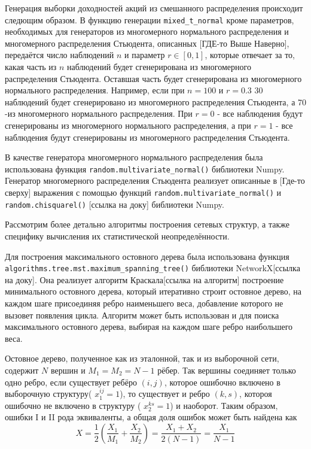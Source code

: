 Генерация выборки доходностей акций из смешанного распределения происходит следющим образом. В функцию генерации \verb|mixed_t_normal| кроме параметров, необходимых для генераторов из многомерного нормального распределения и многомерного распределения Стьюдента, описанных [ГДЕ-то Выше Наверно], передаётся число наблюдений $n$ и параметр $r \in [0,1]$, которые отвечает за то, какая часть из $n$ наблюдений будет сгенерирована из многомерного распределения Стьюдента. Оставшая часть будет сгенерирована из многомерного нормального распределения. Например, если при $n=100$ и $r=0.3$ 30 наблюдений будет сгенерировано из многомерного распределения Стьюдента, а 70 -из многомерного нормального распределения. При $r=0$ - все наблюдения будут сгенерированы из многомерного нормального распределения, а при  $r=1$ - все наблюдения будут сгенерированы из многомерного распределения Стьюдента. 

В качестве генератора многомерного нормального распределения  была использована функция \verb|random.multivariate_normal()| библиотеки Numpy. Генератор 
многомерного распределения Стьюдента реализует описанные в [Где-то сверху] выражения с помощью функций \verb|random.multivariate_normal()| и  \verb|random.chisquarel()| [ссылка на доку] библиотеки Numpy.

Рассмотрим более детально алгоритмы построения сетевых структур, а также специфику вычисления их статистической неопределённости.


Для построения максимального остовного дерева была использована  функция \verb|algorithms.tree.mst.maximum_spanning_tree()| библиотеки NetworkX[ссылка на доку]. Она реализует алгоритм Краскала[ссылка на алгоритм] построение минимального остовного дерева, который итеративно строит остовное дерево, на каждом шаге присоединяя ребро наименьшего веса, добавление которого не вызовет появления цикла. Алгоритм может быть использован и для поиска максимального остовного дерева,  выбирая на каждом шаге ребро наибольшего веса.

Остовное дерево, полученное как из эталонной, так и из выборочной сети, содержит $N$ вершин и $M_1 = M_2 = N-1$ рёбер. Так вершины соединяет только одно ребро, если существует ребёро $(i,j)$, которое ошибочно включено в выборочную структуру( $x^{i j}_1=1$), то существует и ребро  $(k,s)$, котороя ошибочно не включено в структуру ( $x^{k s}_2=1$) и наоборот. Таким образом, ошибки I и II рода эквиваленты, а общая доля ошибок может быть найдена как
\begin{equation}
X = \frac{1}{2}\left(\frac{X_1}{M_1} + \frac{X_2}{M_2}\right) = \frac{X_1 + X_2}{2(N-1)} = \frac{X_1}{N-1}
\end{equation}



